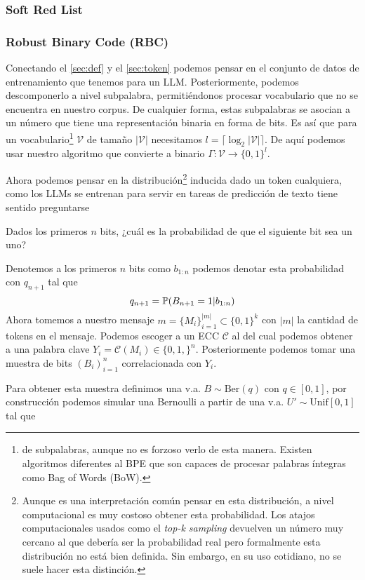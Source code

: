 \documentclass[a4paper,11pt]{article}
\begin{document}
\subsubsection{Soft Red List}
\subsubsection{Robust Binary Code (RBC)}
\par Conectando el \cref{sec:def} y el \cref{sec:token} podemos pensar en el conjunto de datos de entrenamiento que tenemos para un LLM. Posteriormente, podemos descomponerlo a nivel subpalabra, permitiéndonos procesar vocabulario que no se encuentra en nuestro corpus. De cualquier forma, estas subpalabras se asocian a un número que tiene una representación binaria en forma de bits. Es así que para un vocabulario\footnote{de subpalabras, aunque no es forzoso verlo de esta manera. Existen algoritmos diferentes al BPE que son capaces de procesar palabras íntegras como Bag of Words (BoW).} $\mathcal{V}$ de tamaño $|\mathcal V|$ necesitamos $l=\lceil\log_2|\mathcal V|\rceil$. De aquí podemos usar nuestro algoritmo que convierte a binario $\Gamma:\mathcal V\to\{0,1\}^l$.
\par Ahora podemos pensar en la distribución\footnote{Aunque es una interpretación común pensar en esta distribución, a nivel computacional es muy costoso obtener esta probabilidad. Los atajos computacionales usados como el \textit{top-k sampling} devuelven un número muy cercano al que debería ser la probabilidad real pero formalmente esta distribución no está bien definida. Sin embargo, en su uso cotidiano, no se suele hacer esta distinción.} inducida dado un token cualquiera, como los LLMs se entrenan para servir en tareas de predicción de texto tiene sentido preguntarse
\begin{displayquote}
    Dados los primeros $n$ bits, ¿cuál es la probabilidad de que el siguiente bit sea un uno?
\end{displayquote}
Denotemos a los primeros $n$ bits como $b_{1:n}$ podemos denotar esta probabilidad con $q_{n+1}$ tal que
\[q_{n+1}=\mathbb{P}(B_{n+1}=1|b_{1:n})\]
Ahora tomemos a nuestro mensaje $m=\{M_i\}_{i=1}^{|m|}\subset\{0,1\}^k$ con $|m|$ la cantidad de tokens en el mensaje. Podemos escoger a un ECC $\mathcal C$ al del cual podemos obtener a una palabra clave $Y_i=\mathcal C(M_i)\in\{0,1,\}^n$. Posteriormente podemos tomar una muestra de bits $(B_i)_{i=1}^n$ correlacionada con $Y_i$.
\par Para obtener esta muestra definimos una v.a. $B\sim\textrm{Ber}(q)$ con $q\in[0,1]$, por construcción podemos simular una Bernoulli a partir de una v.a. $U'\sim \textrm{Unif}[0,1]$ tal que
\end{document}
